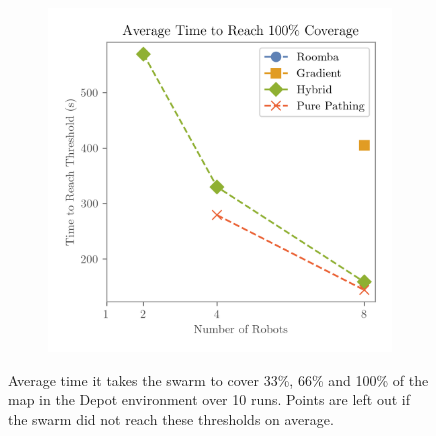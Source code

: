 \begin{figure}[H]
\begin{subfigure}[b]{\w}
    \end{subfigure}
    \begin{subfigure}[b]{\w}
        \centering
        \includegraphics[width=\textwidth]{figures/plots/benchmarks/big-coverage-1.0-depot.png}
    \end{subfigure}
    \caption{Average time it takes the swarm to cover 33\%, 66\% and 100\% of the map in the Depot environment over 10 runs. Points are left out if the swarm did not reach these thresholds on average.}
    \label{fig:depot-threshold}
\end{figure}

